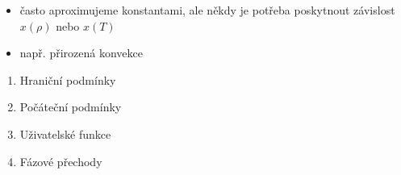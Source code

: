 \documentclass[letterpaper,10pt,czech]{sphinxmanual}
\begin{document}
\begin{enumerate}
\begin{enumerate}
\end{enumerate}
\begin{itemize}
\item {} 
\sphinxAtStartPar
často aproximujeme konstantami, ale někdy je potřeba poskytnout závislost \(x(\rho)\) nebo \(x(T)\)

\item {} 
\sphinxAtStartPar
např. přirozená konvekce

\end{itemize}
\begin{enumerate}
%
\setcounter{enumii}{3}
\item {} 
\sphinxAtStartPar
Hraniční podmínky

\item {} 
\sphinxAtStartPar
Počáteční podmínky

\item {} 
\sphinxAtStartPar
Uživatelské funkce

\item {} 
\sphinxAtStartPar
Fázové přechody

\end{enumerate}

\end{enumerate}
\end{document}
